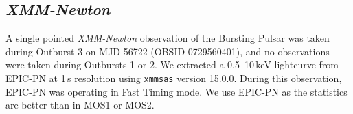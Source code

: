 \subsection{\textit{XMM-Newton}}

\par A single pointed \textit{XMM-Newton} observation of the Bursting Pulsar was taken during Outburst 3 on MJD 56722 (OBSID 0729560401), and no observations were taken during Outbursts 1 or 2.  We extracted a 0.5--10\,keV lightcurve from EPIC-PN at 1\,s resolution using \texttt{xmmsas} version 15.0.0.  During this observation, EPIC-PN was operating in Fast Timing mode.  We use EPIC-PN as the statistics are better than in MOS1 or MOS2.

